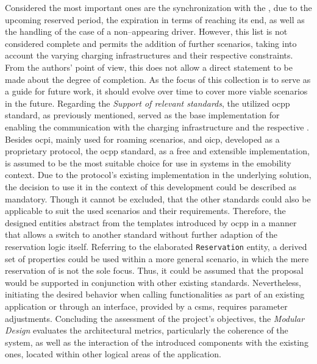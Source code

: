 Considered the most important ones are the synchronization with the , due to the upcoming reserved period, the expiration in terms of reaching its end, as well as the handling of the case of a non--appearing driver.
However, this list is not considered complete and permits the addition of further scenarios, taking into account the varying charging infrastructures and their respective constraints. 
From the authors' point of view, this does not allow a direct statement to be made about the degree of completion. As the focus of this collection is to serve as a guide for future work, it should evolve over time to cover more viable scenarios in the future.
Regarding the \textit{Support of relevant standards}, the utilized \acrshort{ocpp} standard, as previously mentioned, served as the base implementation for enabling the communication with the charging infrastructure and the respective .
Besides \acrshort{ocpi}, mainly used for roaming scenarios, and \acrshort{oicp}, developed as a proprietary protocol, the \acrshort{ocpp} standard, as a free and extensible implementation, is assumed to be the most suitable choice for use in systems in the \acrshort{emobility} context.
Due to the protocol's existing implementation in the underlying solution, the decision to use it in the context of this development could be described as mandatory.
Though it cannot be excluded, that the other standards could also be applicable to suit the used scenarios and their requirements. Therefore, the designed entities abstract from the templates introduced by \acrshort{ocpp} in a manner that allows a switch to another standard without further adaption of the reservation logic itself.
Referring to the elaborated \texttt{Reservation} entity, a derived set of properties could be used within a more general scenario, in which the mere reservation of  is not the sole focus. Thus, it could be assumed that the proposal would be supported in conjunction with other existing standards. 
Nevertheless, initiating the desired behavior when calling functionalities as part of an existing application or through an interface, provided by a \acrshort{csms}, requires parameter adjustments.
Concluding the assessment of the project's objectives, the \textit{Modular Design} evaluates the architectural metrics, particularly the coherence of the system, as well as the interaction of the introduced components with the existing ones, located within other logical areas of the application.
